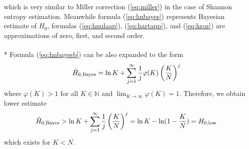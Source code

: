 which is very similar to Miller correction (\ref{eq:miller}) in the case of Shannon entropy estimation. Meanwhile formula (\ref{eq:hnbayes}) represents Bayesian estimate of $H_{0}$, formulas (\ref{eq:hnulaap}), (\ref{eq:hartapp}), and (\ref{eq:hroz}) are approximations of zero, first, and second order. \\
\\*
Formula (\ref{eq:hnbayesb}) can be also expanded to the form
\begin{equation} 
\label{eq:hnbayesbexp}
\hat{H}_{0,\mbox{\scriptsize{Bayes}}} = \ln{K} + \sum_{j=1}^{\infty} \frac{1}{j} \varphi(K)\left(\frac{K}{N}\right)^{j}
\end{equation}
where $\varphi(K)>1$ for all $K \in \mathbb{N}$ and $\lim_{K \rightarrow \infty} \varphi(K) = 1$. Therefore, we obtain lower estimate
\begin{equation}
\label{eq:hnbayesbexplow}
\hat{H}_{0,\mbox{\scriptsize{Bayes}}} > \ln{K} + \sum_{j=1}^{\infty} \frac{1}{j} \left(\frac{K}{N}\right)^{j} = \ln{K} - \ln(1 - \frac{K}{N}) = H_{0,\mbox{\scriptsize{low}}}
\end{equation}
which exists for $K < N$.